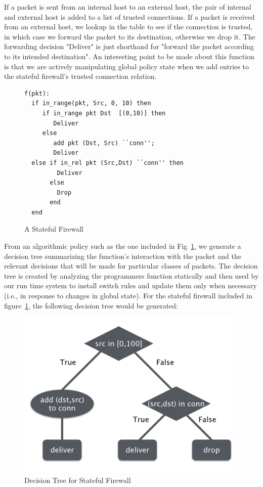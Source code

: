 \documentclass[nocopyrightspace]{sigplanconf}
\begin{document}
If a packet is sent from an internal host to an external host, the pair of internal and external host is added to a list of trusted connections. If a packet is received from an external host, we lookup in the table to see if the connection is trusted, in which case we forward the packet to its destination, otherwise we drop it. The forwarding decision "Deliver" is just shorthand for "forward the packet according to its intended destination".
An interesting point to be made about this function is that we are actively manipulating global policy state when we add entries to the stateful firewall's trusted connection relation.


\begin{figure}[ht]
\begin{lstlisting}
f(pkt):
  if in_range(pkt, Src, 0, 10) then
     if in_range pkt Dst  [(0,10)] then
        Deliver
     else 
        add pkt (Dst, Src) ``conn'';
        Deliver
  else if in_rel pkt (Src,Dst) ``conn'' then
         Deliver
       else
         Drop
       end
  end                
  \end{lstlisting}

\caption{A Stateful Firewall}
\label{fig:firewallcode}
\end{figure}

From an algorithmic policy such as the one included in Fig~\ref{fig:firewallcode}, we generate a decision tree summarizing the function's interaction with the packet and the relevant decisions that will be made for particular classes of packets. The decision tree is created by analyzing the programmers function statically and then used by our run time system to install switch rules and update them only when necessary (i.e., in response to changes in global state). For the stateful firewall included in figure~\ref{fig:firewallcode}, the following decision tree would be generated:


\begin{figure}[ht]
\includegraphics[scale=.5]{img/dtree.png}
\caption{Decision Tree for Stateful Firewall}     
\label{fig:decisiontree}  
  \end{figure}
\end{document}
